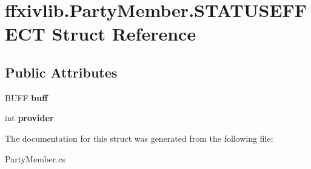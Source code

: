 \hypertarget{structffxivlib_1_1_party_member_1_1_s_t_a_t_u_s_e_f_f_e_c_t}{\section{ffxivlib.\-Party\-Member.\-S\-T\-A\-T\-U\-S\-E\-F\-F\-E\-C\-T Struct Reference}
\label{structffxivlib_1_1_party_member_1_1_s_t_a_t_u_s_e_f_f_e_c_t}
}
\subsection*{Public Attributes}
\begin{DoxyCompactItemize}
\item 
\hypertarget{structffxivlib_1_1_party_member_1_1_s_t_a_t_u_s_e_f_f_e_c_t_ac3eb20d02168470162192da9b6852159}{B\-U\-F\-F {\bfseries buff}}\label{structffxivlib_1_1_party_member_1_1_s_t_a_t_u_s_e_f_f_e_c_t_ac3eb20d02168470162192da9b6852159}

\item 
\hypertarget{structffxivlib_1_1_party_member_1_1_s_t_a_t_u_s_e_f_f_e_c_t_a123f3d9ee1d9db297df62737bdaf87c7}{int {\bfseries provider}}\label{structffxivlib_1_1_party_member_1_1_s_t_a_t_u_s_e_f_f_e_c_t_a123f3d9ee1d9db297df62737bdaf87c7}

\end{DoxyCompactItemize}


The documentation for this struct was generated from the following file\-:\begin{DoxyCompactItemize}
\item 
Party\-Member.\-cs\end{DoxyCompactItemize}
